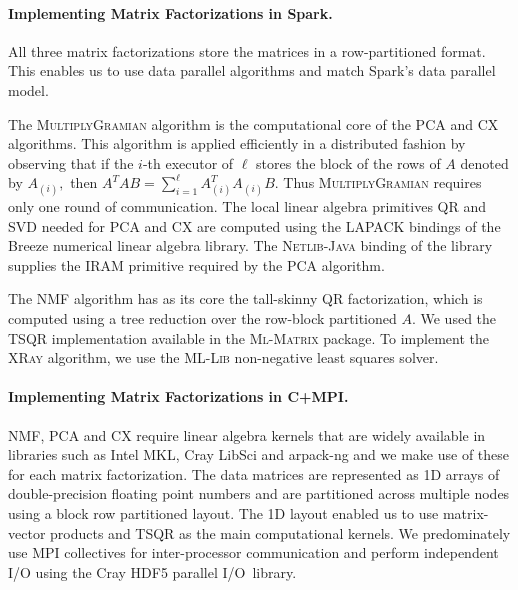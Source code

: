 \paragraph{Implementing Matrix Factorizations in Spark.}
All three matrix factorizations store the matrices in a row-partitioned format. This enables us to use data parallel algorithms and match Spark's data parallel model.

The \textsc{MultiplyGramian} algorithm is the computational core of the PCA and CX algorithms.
This algorithm is applied efficiently in a distributed fashion by observing that if the $i$-th executor of $\ell$ stores the block of the rows of $A$ denoted by $A_{(i)},$ then $A^TA B = \sum_{i=1}^\ell A_{(i)}^T A_{(i)} B.$ Thus \textsc{MultiplyGramian} requires only one round of communication.  The local linear algebra primitives \textsc{QR} and \textsc{SVD} needed for PCA and CX are computed using the \textsc{LAPACK} bindings of the Breeze numerical linear algebra library.  The \textsc{Netlib-Java} binding of the  library supplies the \textsc{IRAM} primitive required by the PCA algorithm. 

The NMF algorithm has as its core the tall-skinny QR factorization, which is computed using a tree reduction over the row-block partitioned $A$.
We used the \textsc{TSQR} implementation available in the \textsc{Ml-Matrix} package. To implement the \textsc{XRay} algorithm, we use the \textsc{ML-Lib} non-negative least squares solver.


\paragraph{Implementing Matrix Factorizations in C+MPI.}
NMF, PCA and CX require linear algebra kernels that are widely available in libraries such as Intel MKL, Cray LibSci and arpack-ng and we make use of these for each matrix factorization. The data matrices are represented as 1D arrays of double-precision floating point numbers and are partitioned across multiple nodes using a block row partitioned layout. The 1D layout enabled us to use matrix-vector products and TSQR as the main computational kernels. We predominately use MPI collectives for inter-processor communication and perform independent I/O using the Cray HDF5 parallel I/O~library.  
